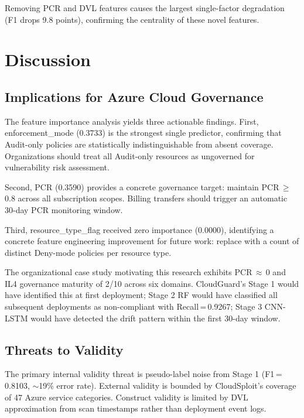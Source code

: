 \documentclass[conference]{IEEEtran}
\begin{document}
Removing PCR and DVL features causes the largest single-factor 
degradation (F1 drops 9.8 points), confirming the centrality of these 
novel features.

\section{Discussion}

\subsection{Implications for Azure Cloud Governance}
The feature importance analysis yields three actionable findings. 
First, enforcement\_mode (0.3733) is the strongest single predictor, 
confirming that Audit-only policies are statistically indistinguishable 
from absent coverage. Organizations should treat all Audit-only 
resources as ungoverned for vulnerability risk assessment.

Second, PCR (0.3590) provides a concrete governance target: maintain 
PCR\,$\geq$\,0.8 across all subscription scopes. Billing transfers 
should trigger an automatic 30-day PCR monitoring window.

Third, resource\_type\_flag received zero importance (0.0000), 
identifying a concrete feature engineering improvement for future work: 
replace with a count of distinct Deny-mode policies per resource type.

The organizational case study motivating this research exhibits 
PCR\,$\approx$\,0 and IL4 governance maturity of 2/10 across six 
domains. CloudGuard's Stage 1 would have identified this at first 
deployment; Stage 2 RF would have classified all subsequent deployments 
as non-compliant with Recall\,=\,0.9267; Stage 3 CNN-LSTM would have 
detected the drift pattern within the first 30-day window.

\subsection{Threats to Validity}
The primary internal validity threat is pseudo-label noise from Stage 1 
(F1\,=\,0.8103, $\sim$19\% error rate). External validity is bounded 
by CloudSploit's coverage of 47 Azure service categories. Construct 
validity is limited by DVL approximation from scan timestamps rather 
than deployment event logs.
\end{document}
